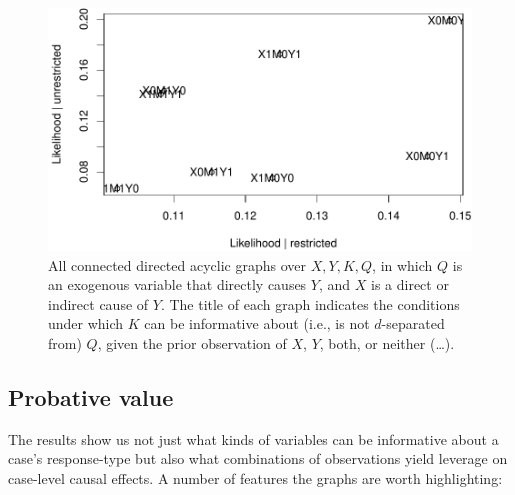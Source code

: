 \documentclass[12pt,]{book}
\begin{document}
\begin{figure}
\centering
\includegraphics{ii_files/figure-latex/unnamed-chunk-39-1.pdf}
\caption{\label{fig:unnamed-chunk-39}\label{fig:34graphs} All connected directed acyclic graphs over \(X,Y,K,Q\), in which \(Q\) is an exogenous variable that directly causes \(Y\), and \(X\) is a direct or indirect cause of \(Y\). The title of each graph indicates the conditions under which \(K\) can be informative about (i.e., is not \(d\)-separated from) \(Q\), given the prior observation of \(X\), \(Y\), both, or neither (\ldots{}).}
\end{figure}

\hypertarget{probative-value}{%
\subsection{Probative value}\label{probative-value}}

The results show us not just what kinds of variables can be informative about a case's response-type but also what combinations of observations yield leverage on case-level causal effects. A number of features the graphs are worth highlighting:
\end{document}
